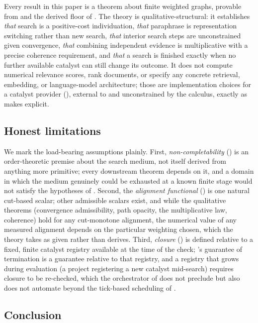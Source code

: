 \documentclass[11pt,twocolumn,a4paper]{article}
\theoremstyle{thmstyle}
\theoremstyle{definition}
\theoremstyle{remark}
\begin{document}
Every result in this paper is a theorem about finite weighted graphs,
provable from  and the derived floor of
. The theory is qualitative-structural: it establishes
\emph{that} search is a positive-cost individuation, \emph{that}
paraphrase is representation switching rather than new search, \emph{that}
interior search steps are unconstrained given convergence, \emph{that}
combining independent evidence is multiplicative with a precise coherence
requirement, and \emph{that} a search is finished exactly when no further
available catalyst can still change its outcome. It does not compute
numerical relevance scores, rank documents, or specify any concrete
retrieval, embedding, or language-model architecture; those are
implementation choices for a catalyst provider (),
external to and unconstrained by the calculus, exactly as
 makes explicit.

\subsection{Honest limitations}

We mark the load-bearing assumptions plainly. First, \emph{non-completability}
() is an order-theoretic premise about the search
medium, not itself derived from anything more primitive; every downstream
theorem depends on it, and a domain in which the medium genuinely could be
exhausted at a known finite stage would not satisfy the hypotheses of
. Second, the \emph{alignment functional}
() is one natural cut-based scalar; other admissible
scalars exist, and while the qualitative theorems (convergence
admissibility, path opacity, the multiplicative law, coherence) hold for
any cut-monotone alignment, the numerical value of any measured alignment
depends on the particular weighting chosen, which the theory takes as
given rather than derives. Third, \emph{closure}
() is defined relative to a fixed, finite catalyst
registry available at the time of the check; 's
guarantee of termination is a guarantee relative to that registry, and a
registry that grows during evaluation (a project registering a new
catalyst mid-search) requires closure to be re-checked, which the
orchestrator of  does not preclude but also does
not automate beyond the tick-based scheduling of .

\subsection{Conclusion}
\end{document}
